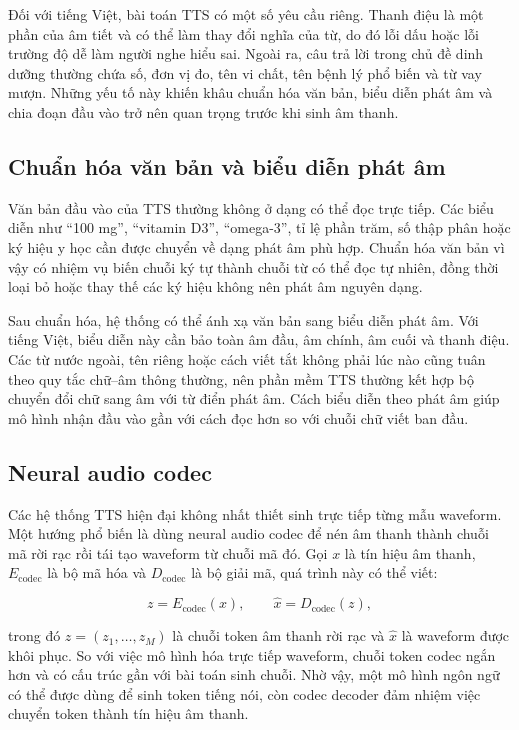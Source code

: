 \documentclass[a4paper,13pt,twoside]{report}
\begin{document}
Đối với tiếng Việt, bài toán TTS có một số yêu cầu riêng. Thanh điệu là một phần của âm tiết và có thể làm thay đổi nghĩa của từ, do đó lỗi dấu hoặc lỗi trường độ dễ làm người nghe hiểu sai. Ngoài ra, câu trả lời trong chủ đề dinh dưỡng thường chứa số, đơn vị đo, tên vi chất, tên bệnh lý phổ biến và từ vay mượn. Những yếu tố này khiến khâu chuẩn hóa văn bản, biểu diễn phát âm và chia đoạn đầu vào trở nên quan trọng trước khi sinh âm thanh.

\subsection{Chuẩn hóa văn bản và biểu diễn phát âm}

Văn bản đầu vào của TTS thường không ở dạng có thể đọc trực tiếp. Các biểu diễn như ``100 mg'', ``vitamin D3'', ``omega-3'', tỉ lệ phần trăm, số thập phân hoặc ký hiệu y học cần được chuyển về dạng phát âm phù hợp. Chuẩn hóa văn bản vì vậy có nhiệm vụ biến chuỗi ký tự thành chuỗi từ có thể đọc tự nhiên, đồng thời loại bỏ hoặc thay thế các ký hiệu không nên phát âm nguyên dạng.

Sau chuẩn hóa, hệ thống có thể ánh xạ văn bản sang biểu diễn phát âm. Với tiếng Việt, biểu diễn này cần bảo toàn âm đầu, âm chính, âm cuối và thanh điệu. Các từ nước ngoài, tên riêng hoặc cách viết tắt không phải lúc nào cũng tuân theo quy tắc chữ--âm thông thường, nên phần mềm TTS thường kết hợp bộ chuyển đổi chữ sang âm với từ điển phát âm. Cách biểu diễn theo phát âm giúp mô hình nhận đầu vào gần với cách đọc hơn so với chuỗi chữ viết ban đầu.

\subsection{Neural audio codec}

Các hệ thống TTS hiện đại không nhất thiết sinh trực tiếp từng mẫu waveform. Một hướng phổ biến là dùng neural audio codec để nén âm thanh thành chuỗi mã rời rạc rồi tái tạo waveform từ chuỗi mã đó. Gọi \(x\) là tín hiệu âm thanh, \(E_{\mathrm{codec}}\) là bộ mã hóa và \(D_{\mathrm{codec}}\) là bộ giải mã, quá trình này có thể viết:

\begin{equation}
    z = E_{\mathrm{codec}}(x),
    \qquad
    \hat{x} = D_{\mathrm{codec}}(z),
\end{equation}

trong đó \(z = (z_1,\ldots,z_M)\) là chuỗi token âm thanh rời rạc và \(\hat{x}\) là waveform được khôi phục. So với việc mô hình hóa trực tiếp waveform, chuỗi token codec ngắn hơn và có cấu trúc gần với bài toán sinh chuỗi. Nhờ vậy, một mô hình ngôn ngữ có thể được dùng để sinh token tiếng nói, còn codec decoder đảm nhiệm việc chuyển token thành tín hiệu âm thanh.
\end{document}
